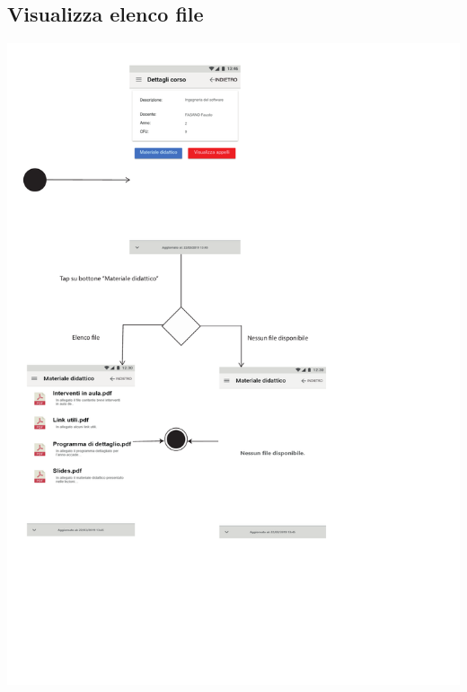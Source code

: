 \subsection{Visualizza elenco file}
\begin{center}
	\includegraphics[width=6in]{imgs/gruppo1/activity_diagrams/AD13_viasualizza_elenco_file.pdf}
\end{center}
\newpage


